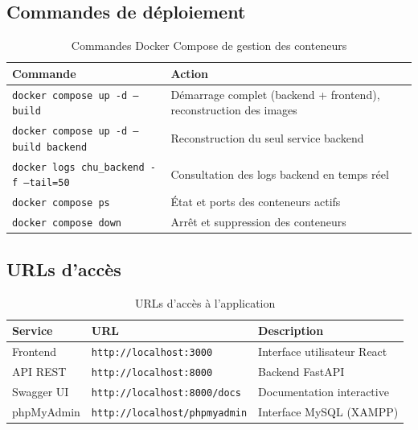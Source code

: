 \documentclass[12pt,a4paper]{report}
\begin{document}
	\subsection{Commandes de déploiement}
	
	\begin{table}[H]
		\centering
		\caption{Commandes Docker Compose de gestion des conteneurs}
		\renewcommand{\arraystretch}{1.3}
		\begin{tabularx}{\textwidth}{lX}
			\toprule
			\textbf{Commande} & \textbf{Action} \\
			\midrule
			\texttt{docker compose up -d --build}          & Démarrage complet (backend + frontend), reconstruction des images \\
			\texttt{docker compose up -d --build backend}  & Reconstruction du seul service backend \\
			\texttt{docker logs chu\_backend -f --tail=50} & Consultation des logs backend en temps réel \\
			\texttt{docker compose ps}                     & État et ports des conteneurs actifs \\
			\texttt{docker compose down}                   & Arrêt et suppression des conteneurs \\
			\bottomrule
		\end{tabularx}
	\end{table}
	
	\subsection{URLs d'accès}
	
	\begin{table}[H]
		\centering
		\caption{URLs d'accès à l'application}
		\begin{tabular}{lll}
			\toprule
			\textbf{Service} & \textbf{URL} & \textbf{Description} \\
			\midrule
			Frontend    & \texttt{http://localhost:3000}       & Interface utilisateur React \\
			API REST    & \texttt{http://localhost:8000}       & Backend FastAPI \\
			Swagger UI  & \texttt{http://localhost:8000/docs}  & Documentation interactive \\
			phpMyAdmin  & \texttt{http://localhost/phpmyadmin} & Interface MySQL (XAMPP) \\
			\bottomrule
		\end{tabular}
	\end{table}
	
\end{document}
